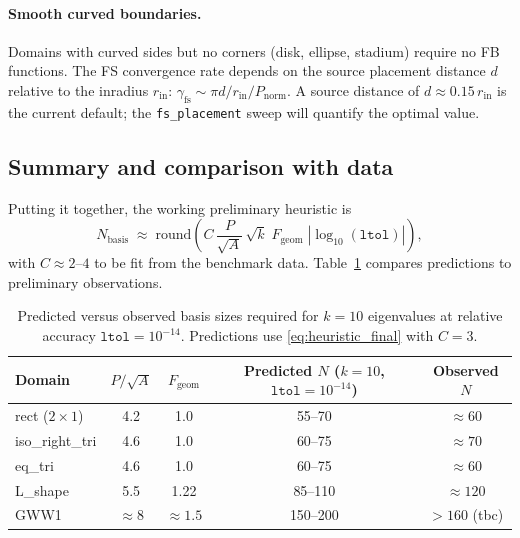 \documentclass[11pt]{article}
\newcommand{\Nbasis}{N_{\mathrm{basis}}}
\newcommand{\ltol}{\texttt{ltol}}
\begin{document}
\paragraph{Smooth curved boundaries.}
Domains with curved sides but no corners (disk, ellipse, stadium) require no FB
functions.  The FS convergence rate depends on the source placement distance
$d$ relative to the inradius $r_{\mathrm{in}}$:
$\gamma_{\mathrm{fs}} \sim \pi d/r_{\mathrm{in}} / P_{\mathrm{norm}}$.
A source distance of $d\approx 0.15\,r_{\mathrm{in}}$ is the current default;
the \texttt{fs\_placement} sweep will quantify the optimal value.

\subsection{Summary and comparison with data}

Putting it together, the working preliminary heuristic is
\begin{equation}\label{eq:heuristic_final}
  \Nbasis
  \;\approx\;
  \mathrm{round}\!\left(
    C\,\frac{P}{\sqrt{A}}\,\sqrt{k}\;F_{\mathrm{geom}}\;|\log_{10}(\ltol)|
  \right),
\end{equation}
with $C\approx 2$--$4$ to be fit from the benchmark data.  Table~\ref{tab:predictions}
compares predictions to preliminary observations.

\begin{table}[h]
\centering
\begin{tabular}{lcccc}
\toprule
Domain & $P/\sqrt{A}$ & $F_{\mathrm{geom}}$ & Predicted $N$ ($k=10$, $\ltol=10^{-14}$) & Observed $N$ \\
\midrule
rect ($2\times 1$)  & 4.2 & 1.0  & 55--70   & $\approx 60$  \\
iso\_right\_tri     & 4.6 & 1.0  & 60--75   & $\approx 70$  \\
eq\_tri             & 4.6 & 1.0  & 60--75   & $\approx 60$  \\
L\_shape            & 5.5 & 1.22 & 85--110  & $\approx 120$ \\
GWW1                & $\approx 8$ & $\approx 1.5$ & 150--200 & $>160$ (tbc) \\
\bottomrule
\end{tabular}
\caption{Predicted versus observed basis sizes required for $k=10$ eigenvalues
at relative accuracy $\ltol=10^{-14}$.  Predictions use
\eqref{eq:heuristic_final} with $C=3$.}
\label{tab:predictions}
\end{table}

\end{document}

